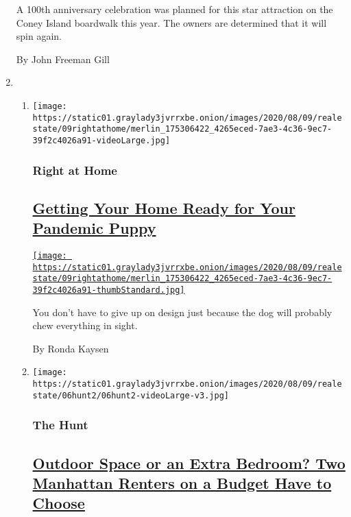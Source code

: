 \begin{enumerate}
  A 100th anniversary celebration was planned for this star attraction
  on the Coney Island boardwalk this year. The owners are determined
  that it will spin again.

  By John Freeman Gill
\item
  \begin{enumerate}
  \def\labelenumii{\arabic{enumii}.}
  \item
    \texttt{[image: https://static01.graylady3jvrrxbe.onion/images/2020/08/09/realestate/09rightathome/merlin\_175306422\_4265eced-7ae3-4c36-9ec7-39f2c4026a91-videoLarge.jpg]}

    \hypertarget{right-at-home}{%
    \subsubsection{Right at Home}\label{right-at-home}}

    \hypertarget{getting-your-home-ready-for-your-pandemic-puppy}{%
    \subsection{\texorpdfstring{\href{/2020/08/07/realestate/pandemic-puppy-home-design.html}{Getting
    Your Home Ready for Your Pandemic
    Puppy}}{Getting Your Home Ready for Your Pandemic Puppy}}\label{getting-your-home-ready-for-your-pandemic-puppy}}

    \href{/2020/08/07/realestate/pandemic-puppy-home-design.html}{\texttt{[image: https://static01.graylady3jvrrxbe.onion/images/2020/08/09/realestate/09rightathome/merlin\_175306422\_4265eced-7ae3-4c36-9ec7-39f2c4026a91-thumbStandard.jpg]}}

    You don't have to give up on design just because the dog will
    probably chew everything in sight.

    By Ronda Kaysen
  \item
    \texttt{[image: https://static01.graylady3jvrrxbe.onion/images/2020/08/09/realestate/06hunt2/06hunt2-videoLarge-v3.jpg]}

    \hypertarget{the-hunt}{%
    \subsubsection{The Hunt}\label{the-hunt}}

    \hypertarget{outdoor-space-or-an-extra-bedroom-two-manhattan-renters-on-a-budget-have-to-choose}{%
    \subsection{\texorpdfstring{\href{/interactive/2020/08/06/realestate/06hunt-rogala.html}{Outdoor
    Space or an Extra Bedroom? Two Manhattan Renters on a Budget Have to
    Choose}}{Outdoor Space or an Extra Bedroom? Two Manhattan Renters on a Budget Have to Choose}}\label{outdoor-space-or-an-extra-bedroom-two-manhattan-renters-on-a-budget-have-to-choose}}


\end{enumerate}
\end{enumerate}
